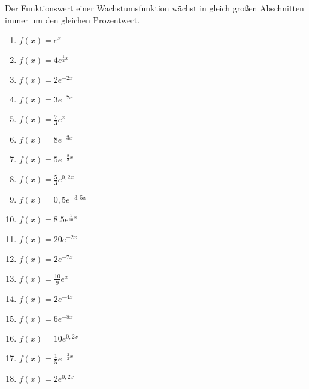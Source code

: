 \begin{tcolorbox}[height=3cm,valign=center]
    \textcolor{loestc}{Der Funktionswert einer Wachstumsfunktion wächst in gleich großen Abschnitten immer um den gleichen Prozentwert.}
\end{tcolorbox}
\newpage
\begin{Exercise}[title={Gib an, ob es sich um eine Wachstums- oder Zerfallsfunktion handelt. Bestimme um wie viele Prozentpunkte der Funktionswert jeweils wächst oder fällt, wenn man \(x\) um 1 vergrößert. Bestimme das \(\Delta x\), nach dem sich der Bestand jeweils verdoppelt oder halbiert.}, label=eFktWZA1]

	\begin{minipage}{\textwidth}
		\begin{minipage}{0.5\textwidth}
			\begin{enumerate}[label=\alph*)]
				\item \(f(x)=e^{x}\)
				\item \(f(x)=4e^{\frac{1}{2}x}\)
				\item \(f(x)=2e^{-2x}\)
				\item \(f(x)=3e^{-7x}\)
				\item \(f(x)=\frac{7}{3}e^{x}\)
				\item \(f(x)=8e^{-3x}\)
				\item \(f(x)=5e^{-\frac{9}{8}x}\)
				\item \(f(x)=\frac{5}{3}e^{0,2x}\)
				\item \(f(x)=0,5e^{-3,5x}\)
				\item \(f(x)=8.5e^{\frac{1}{10}x}\)
				\item \(f(x)=20e^{-2x}\)
				\item \(f(x)=2e^{-7x}\)
				\item \(f(x)=\frac{10}{9}e^{x}\)
			\end{enumerate}
		\end{minipage}%
		\begin{minipage}{0.5\textwidth}
			\begin{enumerate}[label=\alph*)]
				\setcounter{enumi}{13}
				\item \(f(x)=2e^{-4x}\)
				\item \(f(x)=6e^{-8x}\)
				\item \(f(x)=10e^{0,2x}\)
				\item \(f(x)=\frac{1}{5}e^{-\frac{2}{3}x}\)
				\item \(f(x)=2e^{0,2x}\)

\end{enumerate}
\end{minipage}
\end{minipage}
\end{Exercise}
